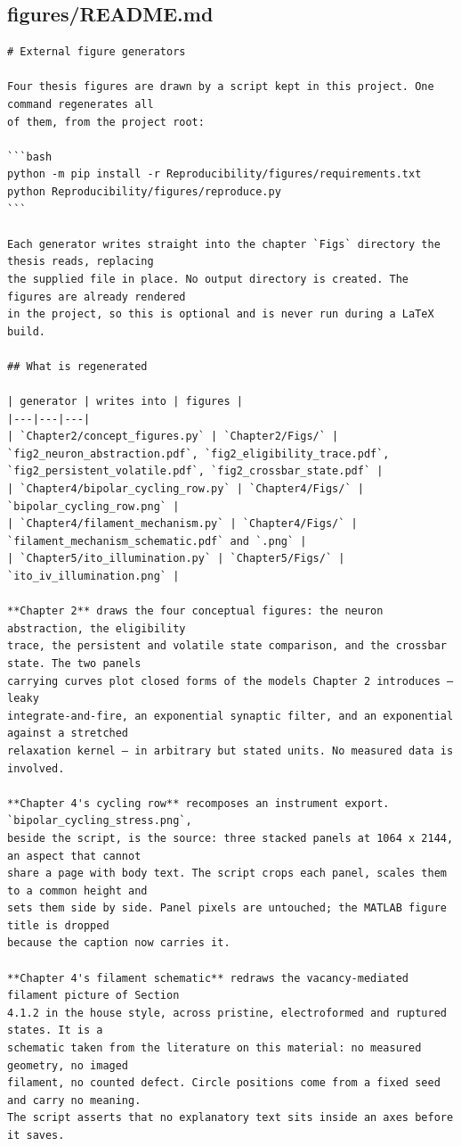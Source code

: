 \documentclass[a4paper,10pt]{article}
\begin{document}
\subsection{figures/README.md}
\begin{Verbatim}
# External figure generators

Four thesis figures are drawn by a script kept in this project. One command regenerates all
of them, from the project root:

```bash
python -m pip install -r Reproducibility/figures/requirements.txt
python Reproducibility/figures/reproduce.py
```

Each generator writes straight into the chapter `Figs` directory the thesis reads, replacing
the supplied file in place. No output directory is created. The figures are already rendered
in the project, so this is optional and is never run during a LaTeX build.

## What is regenerated

| generator | writes into | figures |
|---|---|---|
| `Chapter2/concept_figures.py` | `Chapter2/Figs/` | `fig2_neuron_abstraction.pdf`, `fig2_eligibility_trace.pdf`, `fig2_persistent_volatile.pdf`, `fig2_crossbar_state.pdf` |
| `Chapter4/bipolar_cycling_row.py` | `Chapter4/Figs/` | `bipolar_cycling_row.png` |
| `Chapter4/filament_mechanism.py` | `Chapter4/Figs/` | `filament_mechanism_schematic.pdf` and `.png` |
| `Chapter5/ito_illumination.py` | `Chapter5/Figs/` | `ito_iv_illumination.png` |

**Chapter 2** draws the four conceptual figures: the neuron abstraction, the eligibility
trace, the persistent and volatile state comparison, and the crossbar state. The two panels
carrying curves plot closed forms of the models Chapter 2 introduces — leaky
integrate-and-fire, an exponential synaptic filter, and an exponential against a stretched
relaxation kernel — in arbitrary but stated units. No measured data is involved.

**Chapter 4's cycling row** recomposes an instrument export. `bipolar_cycling_stress.png`,
beside the script, is the source: three stacked panels at 1064 x 2144, an aspect that cannot
share a page with body text. The script crops each panel, scales them to a common height and
sets them side by side. Panel pixels are untouched; the MATLAB figure title is dropped
because the caption now carries it.

**Chapter 4's filament schematic** redraws the vacancy-mediated filament picture of Section
4.1.2 in the house style, across pristine, electroformed and ruptured states. It is a
schematic taken from the literature on this material: no measured geometry, no imaged
filament, no counted defect. Circle positions come from a fixed seed and carry no meaning.
The script asserts that no explanatory text sits inside an axes before it saves.


\end{Verbatim}
\end{document}
